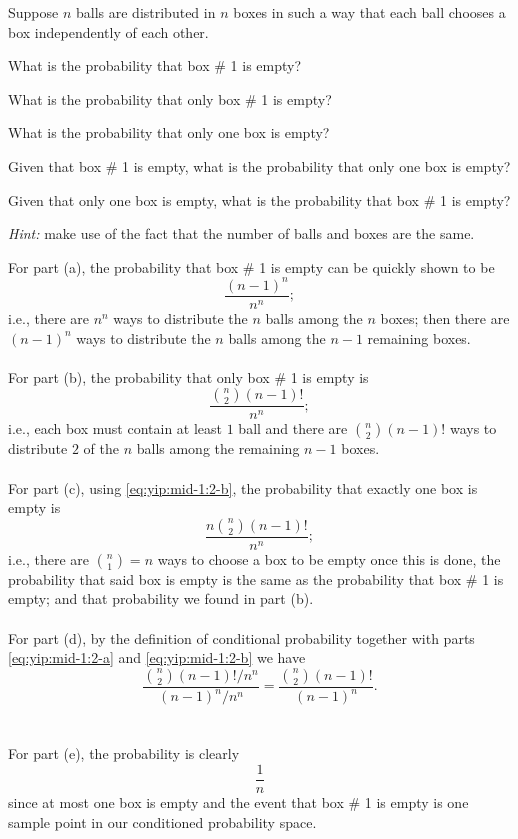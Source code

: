 \begin{problem}
  Suppose \(n\) balls are distributed in \(n\) boxes in such a way that
  each ball chooses a box independently of each other.
  \begin{alphlist}
  \item What is the probability that box \# 1 is empty?
  \item What is the probability that only box \# 1 is empty?
  \item What is the probability that only one box is empty?
  \item Given that box \# 1 is empty, what is the probability that only one
    box is empty?
  \item Given that only one box is empty, what is the probability that box
    \# 1 is empty?
  \end{alphlist}

  \noindent\emph{Hint:} make use of the fact that the number of balls and
  boxes are the same.
\end{problem}
\begin{solution*}
  For part (a), the probability that box \# 1 is empty can be quickly shown
  to be
  \begin{equation}
    \label{eq:yip:mid-1:2-a}
    \frac{(n-1)^n}{n^n};
  \end{equation}
  i.e., there are \(n^n\) ways to distribute the \(n\) balls among the
  \(n\) boxes; then there are \((n-1)^n\) ways to distribute the \(n\)
  balls among the \(n-1\) remaining boxes.
  \\\\
  For part (b), the probability that only box \# 1 is empty is
  \begin{equation}
    \label{eq:yip:mid-1:2-b}
    \frac{\binom{n}{2}(n-1)!}{n^n};
  \end{equation}
  i.e., each box must contain at least \(1\) ball and there are
  \(\binom{n}{2}(n-1)!\) ways to distribute \(2\) of the \(n\) balls among
  the remaining \(n-1\) boxes.
  \\\\
  For part (c), using \eqref{eq:yip:mid-1:2-b}, the probability that
  exactly one box is empty is
  \[
    \frac{n\binom{n}{2}(n-1)!}{n^n};
  \]
  i.e., there are \(\binom{n}{1}=n\) ways to choose a box to be empty once
  this is done, the probability that said box is empty is the same as the
  probability that box \# 1 is empty; and that probability we found in part
  (b).
  \\\\
  For part (d), by the definition of conditional probability together with
  parts \eqref{eq:yip:mid-1:2-a} and \eqref{eq:yip:mid-1:2-b} we have
  \[
    \frac{\binom{n}{2}(n-1)!/n^n}{(n-1)^n/n^n}=\frac{\binom{n}{2}(n-1)!}{(n-1)^n}.
  \]
  \\\\
  For part (e), the probability is clearly
  \[
    \frac{1}{n}
  \]
  since at most one box is empty and the event that box \# 1 is empty is
  one sample point in our conditioned probability space.
\end{solution*}

